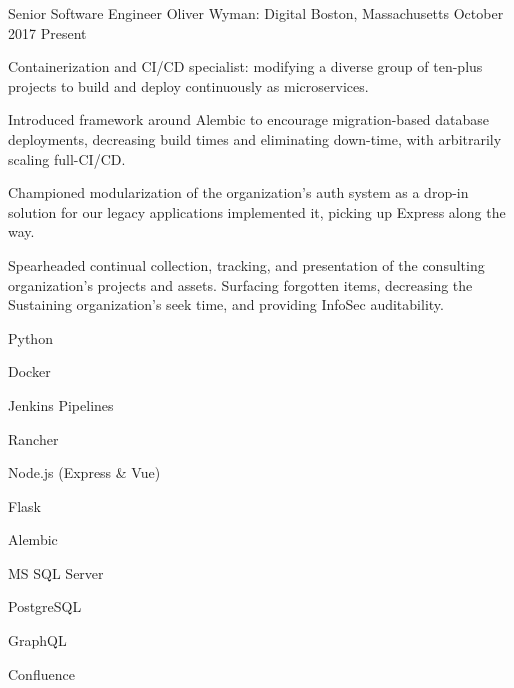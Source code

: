 

\begin{cventries}

  \cventry%
    {Senior Software Engineer} %
    {Oliver Wyman: Digital} %
    {Boston, Massachusetts} %
    {October 2017 \- Present} %
    {%
      \begin{cvitems} %
        \item Containerization and CI/CD specialist: modifying a diverse group of ten-plus projects to build and deploy continuously as microservices.
        \item Introduced framework around Alembic to encourage migration-based database deployments, decreasing build times and eliminating down-time, with arbitrarily scaling full-CI/CD\@.
        \item Championed modularization of the organization's auth system as a drop-in solution for our legacy applications \- implemented it, picking up Express along the way.
        \item Spearheaded continual collection, tracking, and presentation of the consulting organization's projects and assets. Surfacing forgotten items, decreasing the Sustaining organization's seek time, and providing InfoSec auditability.
      \end{cvitems}
    }
    \begin{cventryskills}
      \item Python
      \item Docker
      \item Jenkins Pipelines
      \item Rancher
      \item Node.js (Express \& Vue)
      \item Flask
      \item Alembic
      \item MS SQL Server
      \item PostgreSQL
      \item GraphQL
      \item Confluence%
    \end{cventryskills}


\end{cventries}
